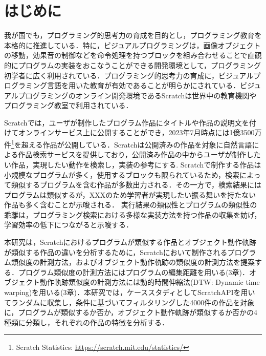 \documentclass[T,J]{fose} %
\newcommand{\todo}[1]{\colorbox{yellow}{{\bf TODO}:}{\color{red} {\textbf{[#1]}}}}
\begin{document}
\section{はじめに}
我が国でも，プログラミング的思考力の育成を目的とし，プログラミング教育を本格的に推進している．特に，ビジュアルプログラミングは，画像オブジェクトの移動，効果音の制御などを命令処理を持つブロックを組み合わせることで直観的にプログラムの実装をおこなうことができる開発環境として，プログラミング初学者に広く利用されている．プログラミング的思考力の育成に，ビジュアルプログラミング言語を用いた教育が有効であることが明らかにされている\cite{}\cite{}．ビジュアルプログラミングのオンライン開発環境であるScratchは世界中の教育機関やプログラミング教室で利用されている．

Scratchでは，ユーザが制作したプログラム作品にタイトルや作品の説明文を付けてオンラインサービス上に公開することができ，2023年7月時点には1億3500万件\footnote{Scratch Statistics: \url{https://scratch.mit.edu/statistics/}}を超える作品が公開している．Scratchは公開済みの作品を対象に自然言語による作品検索サービスを提供しており，公開済み作品の中からユーザが制作したい作品，実現したい動作を検索し，実装の参考にする\cite{}.
Scratchで制作する作品は小規模なプログラムが多く，使用するブロックも限られているため，検索によって類似するプログラムを含む作品が多数出力される．その一方で，検索結果にはプログラムは類似するが，XXXのため学習者が実現したい振る舞いを持たない作品も多く含むことが示唆される．
実行結果の類似性とプログラムの類似性の乖離は，プログラミング検索における多様な実装方法を持つ作品の収集を妨げ，学習効率の低下につながると示唆する．

本研究は，Scratchにおけるプログラムが類似する作品とオブジェクト動作軌跡が類似する作品の違いを分析するために，Scratchにおいて制作されるプログラム類似度の計測方法，およびオブジェクト動作軌跡の類似度の計測方法を提案する．プログラム類似度の計測方法にはプログラムの編集距離を用いる(3章)．オブジェクト動作軌跡類似度の計測方法には動的時間伸縮法(DTW: Dynamic time warping)を用いる(3章)．本研究では，ケーススタディとしてScratchAPIを用いてランダムに収集し，条件に基づいてフィルタリングした4000件の作品を対象に，プログラムが類似するか否か，オブジェクト動作軌跡が類似するか否かの4種類に分類し，それぞれの作品の特徴を分析する．
\end{document}
